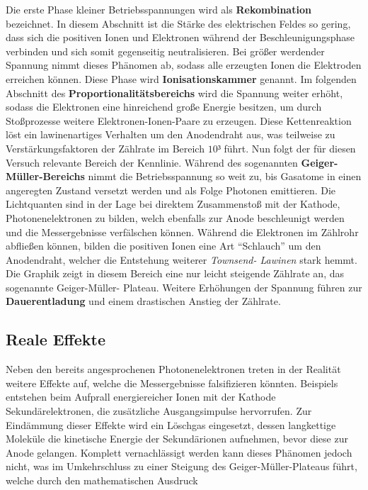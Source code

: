 \noindent Die erste Phase kleiner Betriebsspannungen wird als \textbf{Rekombination} bezeichnet. In diesem Abschnitt ist die 
Stärke des elektrischen Feldes so gering, dass sich die positiven Ionen und Elektronen während der Beschleunigungsphase verbinden
und sich somit gegenseitig neutralisieren. Bei größer werdender Spannung nimmt dieses Phänomen ab, sodass alle erzeugten 
Ionen die Elektroden erreichen können. Diese Phase wird \textbf{Ionisationskammer} genannt. Im folgenden Abschnitt des 
\textbf{Proportionalitätsbereichs} wird die Spannung weiter erhöht, sodass die Elektronen eine hinreichend große Energie 
besitzen, um durch Stoßprozesse weitere Elektronen-Ionen-Paare zu erzeugen. Diese Kettenreaktion löst ein lawinenartiges 
Verhalten um den Anodendraht aus, was teilweise zu Verstärkungsfaktoren der Zählrate im Bereich $10³$ führt. Nun folgt der 
für diesen Versuch relevante Bereich der Kennlinie. Während des sogenannten \textbf{Geiger-Müller-Bereichs} nimmt die 
Betriebsspannung so weit zu, bis Gasatome in einen angeregten Zustand versetzt werden und als Folge Photonen emittieren. 
Die Lichtquanten sind in der Lage bei direktem Zusammenstoß mit der Kathode, Photonenelektronen zu bilden, welch ebenfalls
zur Anode beschleunigt werden und die Messergebnisse verfälschen können. Während die Elektronen im Zählrohr abfließen können,
bilden die positiven Ionen eine Art \enquote{Schlauch} um den Anodendraht, welcher die Entstehung weiterer \emph{Townsend-
Lawinen} stark hemmt. Die Graphik zeigt in diesem Bereich eine nur leicht steigende Zählrate an, das sogenannte Geiger-Müller-
Plateau. Weitere Erhöhungen der Spannung führen zur \textbf{Dauerentladung} und einem drastischen Anstieg der Zählrate.

\subsection{Reale Effekte}

Neben den bereits angesprochenen Photonenelektronen treten in der Realität weitere Effekte auf, welche die Messergebnisse 
falsifizieren könnten. Beispiels entstehen beim Aufprall energiereicher Ionen mit der Kathode Sekundärelektronen, die 
zusätzliche Ausgangsimpulse hervorrufen. Zur Eindämmung dieser Effekte wird ein Löschgas eingesetzt, dessen langkettige
Moleküle die kinetische Energie der Sekundärionen aufnehmen, bevor diese zur Anode gelangen. Komplett vernachlässigt werden 
kann dieses Phänomen jedoch nicht, was im Umkehrschluss zu einer Steigung des Geiger-Müller-Plateaus führt, welche durch 
den mathematischen Ausdruck

